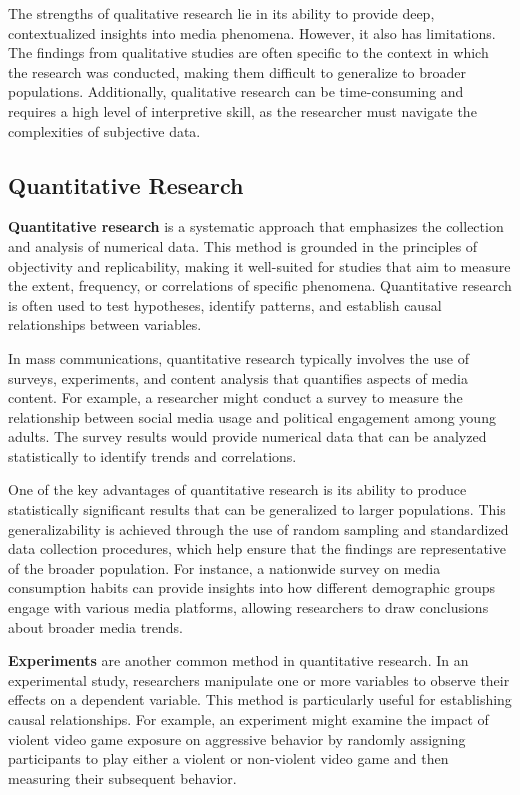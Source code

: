 \documentclass[
]{book}
\begin{document}
The strengths of qualitative research lie in its ability to provide deep, contextualized insights into media phenomena. However, it also has limitations. The findings from qualitative studies are often specific to the context in which the research was conducted, making them difficult to generalize to broader populations. Additionally, qualitative research can be time-consuming and requires a high level of interpretive skill, as the researcher must navigate the complexities of subjective data.

\subsection*{Quantitative Research}\label{quantitative-research}

\textbf{Quantitative research} is a systematic approach that emphasizes the collection and analysis of numerical data. This method is grounded in the principles of objectivity and replicability, making it well-suited for studies that aim to measure the extent, frequency, or correlations of specific phenomena. Quantitative research is often used to test hypotheses, identify patterns, and establish causal relationships between variables.

In mass communications, quantitative research typically involves the use of surveys, experiments, and content analysis that quantifies aspects of media content. For example, a researcher might conduct a survey to measure the relationship between social media usage and political engagement among young adults. The survey results would provide numerical data that can be analyzed statistically to identify trends and correlations.

One of the key advantages of quantitative research is its ability to produce statistically significant results that can be generalized to larger populations. This generalizability is achieved through the use of random sampling and standardized data collection procedures, which help ensure that the findings are representative of the broader population. For instance, a nationwide survey on media consumption habits can provide insights into how different demographic groups engage with various media platforms, allowing researchers to draw conclusions about broader media trends.

\textbf{Experiments} are another common method in quantitative research. In an experimental study, researchers manipulate one or more variables to observe their effects on a dependent variable. This method is particularly useful for establishing causal relationships. For example, an experiment might examine the impact of violent video game exposure on aggressive behavior by randomly assigning participants to play either a violent or non-violent video game and then measuring their subsequent behavior.
\end{document}
